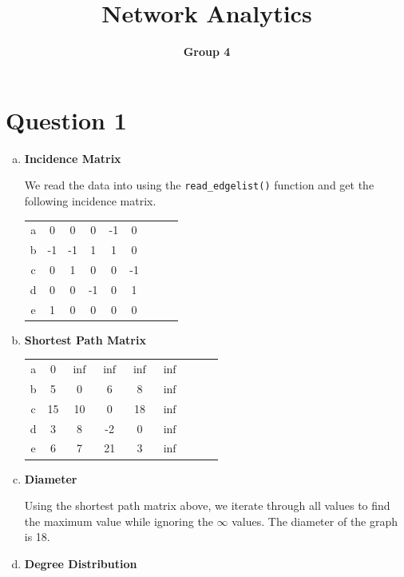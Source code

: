 \documentclass[a4paper]{article}
\begin{document}
\title{Network Analytics}
\author{\bf Group 4}
\maketitle
\section*{Question 1}

\begin{enumerate}[(a)]
\item \textbf{Incidence Matrix}

We read the data into using the \texttt{read\_edgelist()} function and get the following incidence matrix.
\begin{table}[ht]
\begin{center}
\begin{tabular}{c|cccccccc}
a & 0 	& 0 	& 0 	& -1 	& 0\\
b &-1 	& -1	& 1 	& 1	&0\\
c &0 	& 1 	& 0 	& 0	&-1\\
d & 0 	& 0 	& -1 	& 0	& 1\\
e & 1 	& 0 	& 0 	& 0	& 0
\end{tabular}
\end{center}
\end{table}

\item \textbf{Shortest Path Matrix}

\begin{table}[ht]
\begin{center}
\begin{tabular}{c|cccccccc}
a & 0 	& $\inf$	& $\inf$	& $\inf$ & $\inf$\\
b &5 	& 0	& 6 	& 8	&$\inf$\\
c &15 	& 10 	& 0 	& 18	&$\inf$\\
d & 3 	& 8 	& -2 	& 0	&$ \inf$\\
e & 6 	& 7 	& 21	& 3	&$ \inf$
\end{tabular}
\end{center}
\end{table}

\item \textbf{Diameter}

Using the shortest path matrix above, we iterate through all values to find the maximum value while ignoring the $\infty$ values. The diameter of the graph is 18.

\item \textbf{Degree Distribution}


\end{enumerate}
\end{document}
